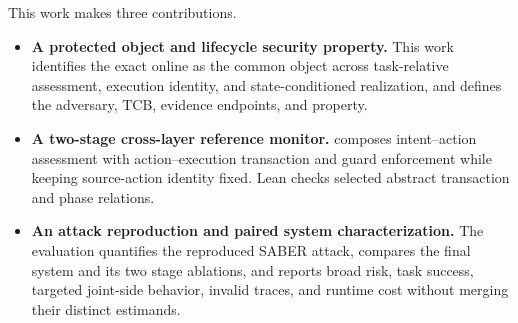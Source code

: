 This work makes three contributions.
\begin{itemize}
  \item \textbf{A protected object and lifecycle security property.}  This work
  identifies the exact online \actionblock as the common object across
  task-relative assessment, execution identity, and state-conditioned
  realization, and defines the adversary, TCB, evidence endpoints, and
  \proofaligned property.
  \item \textbf{A two-stage cross-layer reference monitor.}  \system composes
  \lone intent--action assessment with \ltwo action--execution transaction and
  guard enforcement while keeping source-action identity fixed.  Lean checks
  selected abstract transaction and phase relations.
  \item \textbf{An attack reproduction and paired system characterization.}
  The evaluation quantifies the reproduced SABER attack, compares the final
  system and its two stage ablations, and reports broad risk, task success,
  targeted joint-side behavior, invalid traces, and runtime cost without merging
  their distinct estimands.
\end{itemize}
